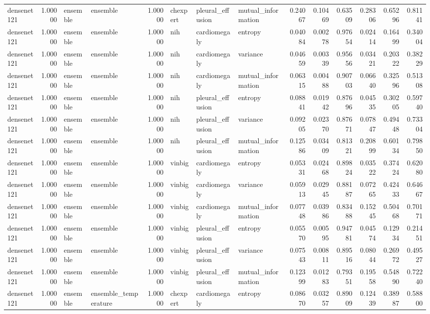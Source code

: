 \begin{tabular}{lrllrlllrrrrrr}
densenet121 & 1.00000 & ensemble & ensemble & 1.00000 & chexpert & pleural\_effusion & mutual\_information & 0.24067 & 0.10469 & 0.63509 & 0.28306 & 0.65296 & 0.81141 \\
densenet121 & 1.00000 & ensemble & ensemble & 1.00000 & nih & cardiomegaly & entropy & 0.04084 & 0.00278 & 0.97654 & 0.02414 & 0.16499 & 0.34004 \\
densenet121 & 1.00000 & ensemble & ensemble & 1.00000 & nih & cardiomegaly & variance & 0.04659 & 0.00339 & 0.95656 & 0.03421 & 0.20322 & 0.38229 \\
densenet121 & 1.00000 & ensemble & ensemble & 1.00000 & nih & cardiomegaly & mutual\_information & 0.06315 & 0.00488 & 0.90703 & 0.06640 & 0.32596 & 0.51308 \\
densenet121 & 1.00000 & ensemble & ensemble & 1.00000 & nih & pleural\_effusion & entropy & 0.08841 & 0.01942 & 0.87696 & 0.04535 & 0.30205 & 0.59740 \\
densenet121 & 1.00000 & ensemble & ensemble & 1.00000 & nih & pleural\_effusion & variance & 0.09205 & 0.02370 & 0.87671 & 0.07847 & 0.49448 & 0.73304 \\
densenet121 & 1.00000 & ensemble & ensemble & 1.00000 & nih & pleural\_effusion & mutual\_information & 0.12586 & 0.03409 & 0.81321 & 0.20899 & 0.60134 & 0.79850 \\
densenet121 & 1.00000 & ensemble & ensemble & 1.00000 & vinbig & cardiomegaly & entropy & 0.05331 & 0.02468 & 0.89824 & 0.03522 & 0.37424 & 0.62080 \\
densenet121 & 1.00000 & ensemble & ensemble & 1.00000 & vinbig & cardiomegaly & variance & 0.05913 & 0.02945 & 0.88187 & 0.07265 & 0.42433 & 0.64667 \\
densenet121 & 1.00000 & ensemble & ensemble & 1.00000 & vinbig & cardiomegaly & mutual\_information & 0.07748 & 0.03986 & 0.83488 & 0.15245 & 0.50468 & 0.70171 \\
densenet121 & 1.00000 & ensemble & ensemble & 1.00000 & vinbig & pleural\_effusion & entropy & 0.05570 & 0.00595 & 0.94781 & 0.04574 & 0.12934 & 0.21451 \\
densenet121 & 1.00000 & ensemble & ensemble & 1.00000 & vinbig & pleural\_effusion & variance & 0.07543 & 0.00811 & 0.89516 & 0.08044 & 0.26972 & 0.49527 \\
densenet121 & 1.00000 & ensemble & ensemble & 1.00000 & vinbig & pleural\_effusion & mutual\_information & 0.12399 & 0.01283 & 0.79351 & 0.19558 & 0.54890 & 0.72240 \\
densenet121 & 1.00000 & ensemble & ensemble\_temperature & 1.00000 & chexpert & cardiomegaly & entropy & 0.08670 & 0.03257 & 0.89009 & 0.12439 & 0.38987 & 0.58800 \\

\end{tabular}
